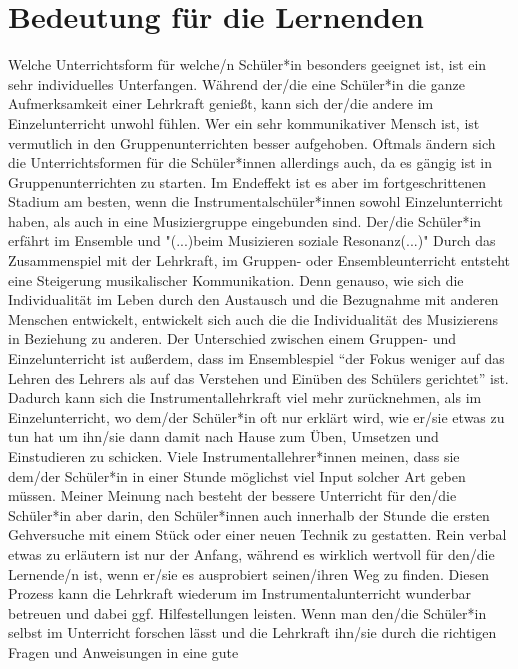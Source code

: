 \section{Bedeutung für die Lernenden}
Welche Unterrichtsform für welche/n Schüler*in besonders geeignet ist, ist ein
sehr individuelles Unterfangen. Während der/die eine Schüler*in die ganze
Aufmerksamkeit einer Lehrkraft genießt, kann sich der/die andere im
Einzelunterricht unwohl fühlen. Wer ein sehr kommunikativer Mensch ist, ist
vermutlich in den Gruppenunterrichten besser aufgehoben. Oftmals ändern sich die
Unterrichtsformen für die Schüler*innen allerdings auch, da es gängig ist in
Gruppenunterrichten zu starten. Im Endeffekt ist es aber im fortgeschrittenen
Stadium am besten, wenn die Instrumentalschüler*innen sowohl Einzelunterricht
haben, als auch in eine Musiziergruppe eingebunden sind. Der/die Schüler*in
erfährt im Ensemble und "(...)beim Musizieren soziale Resonanz(...)"
\autocite[28]{mitzscherlich:musikpsychologie} Durch das Zusammenspiel mit der
Lehrkraft, im Gruppen- oder Ensembleunterricht entsteht eine Steigerung
musikalischer Kommunikation. \autocite[99]{mitzscherlich:musikpsychologie} Denn
genauso, wie sich die Individualität im Leben durch den Austausch und die
Bezugnahme mit anderen Menschen entwickelt, entwickelt sich auch die die
Individualität des Musizierens in Beziehung zu anderen. Der Unterschied zwischen
einem Gruppen- und Einzelunterricht ist außerdem, dass im Ensemblespiel
\enquote{der Fokus weniger auf das Lehren des Lehrers als auf das Verstehen und
Einüben des Schülers gerichtet} ist.
\autocite[31]{losert:die_kunst_zu_unterrichten} Dadurch kann sich die
Instrumentallehrkraft viel mehr zurücknehmen, als im Einzelunterricht, wo
dem/der Schüler*in oft nur erklärt wird, wie er/sie etwas zu tun hat um ihn/sie
dann damit nach Hause zum Üben, Umsetzen und Einstudieren zu schicken. Viele
Instrumentallehrer*innen meinen, dass sie dem/der Schüler*in in einer Stunde
möglichst viel Input solcher Art geben müssen. Meiner Meinung nach besteht der
bessere Unterricht für den/die Schüler*in aber darin, den Schüler*innen auch
innerhalb der Stunde die ersten Gehversuche mit einem Stück oder einer neuen
Technik zu gestatten. Rein verbal etwas zu erläutern ist nur der Anfang, während
es wirklich wertvoll für den/die Lernende/n ist, wenn er/sie es ausprobiert
seinen/ihren Weg zu finden. Diesen Prozess kann die Lehrkraft wiederum im
Instrumentalunterricht wunderbar betreuen und dabei ggf. Hilfestellungen
leisten. Wenn man den/die Schüler*in selbst im Unterricht forschen lässt und die
Lehrkraft ihn/sie durch die richtigen Fragen und Anweisungen in eine gute
